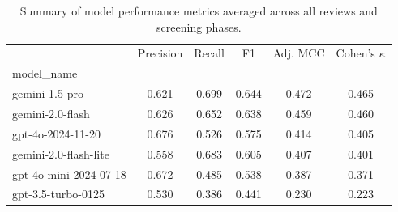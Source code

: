 \begin{table}
\caption{Summary of model performance metrics averaged across all reviews and screening phases.}
\label{tab:metrics_summary}
\begin{tabular}{lccccc}
\toprule
 & Precision & Recall & F1 & Adj. MCC & Cohen's $\kappa$ \\
model_name &  &  &  &  &  \\
\midrule
gemini-1.5-pro & 0.621 & 0.699 & 0.644 & 0.472 & 0.465 \\
gemini-2.0-flash & 0.626 & 0.652 & 0.638 & 0.459 & 0.460 \\
gpt-4o-2024-11-20 & 0.676 & 0.526 & 0.575 & 0.414 & 0.405 \\
gemini-2.0-flash-lite & 0.558 & 0.683 & 0.605 & 0.407 & 0.401 \\
gpt-4o-mini-2024-07-18 & 0.672 & 0.485 & 0.538 & 0.387 & 0.371 \\
gpt-3.5-turbo-0125 & 0.530 & 0.386 & 0.441 & 0.230 & 0.223 \\
\bottomrule
\end{tabular}
\end{table}
